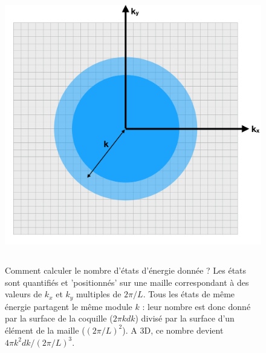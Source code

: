 \begin{figure}[htbp]
	\centering
		\includegraphics[height=12cm]{figs/k.png}
	\caption[Calcul de la densité d'état libres]{Comment calculer le nombre d'états d'énergie donnée ? Les états sont quantifiés et 'positionnés' sur une maille correspondant à des valeurs de $k_x$ et $k_y$ multiples de $2\pi/L$. Tous les états de même énergie partagent le même module $k$ : leur nombre est donc donné par la surface de la coquille ($2\pi k dk$) divisé par la surface d'un élément de la maille ($(2\pi/L)^2$). A 3D, ce nombre devient $4 \pi k^2 dk / (2\pi/L)^3$.}
	\label{f:k}
\end{figure}

